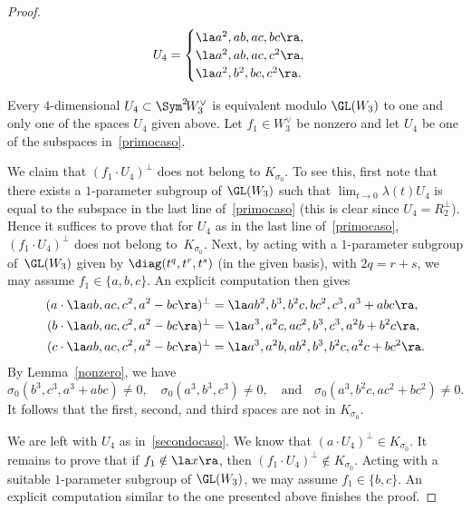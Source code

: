 \begin{proof}
\begin{minipage}[m]{.5\textwidth}
\end{minipage}
\hfill
{}
\hfill
\begin{minipage}[m]{.4\textwidth}
\begin{equation}\label{secondocaso}
U_4=
\begin{cases}
\la a^2,ab,ac,bc\ra, \\
\la a^2,ab,ac,c^2\ra, \\
\la a^2,b^2,bc,c^2\ra.\\
\end{cases}
\end{equation}
\end{minipage}
\par\smallskip\noindent
Every $4$-dimensional $U_4\subset \Sym^2 \!W^{\vee}_3$ is equivalent modulo $\GL(W_3)$ to one and only one of the spaces $U_4$ given above. Let $ f_1\in W_3^{\vee}$ be nonzero and let $U_4$ be one of the subspaces in~\eqref{primocaso}.

We claim that $(f_1\cdot U_4)^{\bot}$ does not belong to $K_{\sigma_0}$. To see this, first note that there exists a $1$-parameter subgroup of $\GL(W_3)$ such that $\lim_{t\to 0}\lambda(t)U_4$ is equal to the subspace in the last line of~\eqref{primocaso} (this is clear since $U_4=R_2^{\bot}$). Hence it suffices
to prove that for $U_4$ as in the last line of~\eqref{primocaso}, $(f_1\cdot U_4)^{\bot}$ does not belong to~$K_{\sigma_0}$. Next, by acting with a $1$-parameter subgroup of~$\GL(W_3)$ given by $\diag(t^q,t^r,t^s)$ (in the given basis), with $2q=r+s$, we may assume $f_1\in\{a,b,c\}$. An explicit computation then gives
\begin{align*}
(a\cdot \la ab,ac,c^2,a^2-bc\ra)^{\bot} & = \la ab^2,b^3,b^2c,bc^2,c^3,a^3+abc\ra, \\
(b\cdot \la ab,ac,c^2,a^2-bc\ra)^{\bot} & = \la a^3,a^2 c,ac^2,b^3,c^3,a^2b+b^2c\ra, \\
(c\cdot \la ab,ac,c^2,a^2-bc\ra)^{\bot} & = \la a^3,a^2 b,ab^2,b^3,b^2c,a^2c+bc^2\ra.
\end{align*}
By Lemma~\ref{nonzero}, we have
\[
\sigma_0(b^3,c^3,a^3+abc)\ne 0,\quad\sigma_0(a^3,b^3,c^3)\ne 0,\quad\text{and}\quad\sigma_0(a^3,b^2c,ac^2+bc^2)\ne 0.
\]
It follows that the first, second, and third spaces are not in $K_{\sigma_0}$.

We are left with $U_4$ as in~\eqref{secondocaso}. We know that $(a\cdot U_4)^{\bot}\in K_{\sigma_0}$. It remains to prove that if $f_1\notin\la x\ra$, then $(f_1\cdot U_4)^{\bot}\notin K_{\sigma_0}$. Acting with a suitable $1$-parameter subgroup of
$\GL(W_3)$, we may assume $f_1\in\{b,c\}$. An explicit computation similar to the one presented above finishes the proof.
\end{proof}


